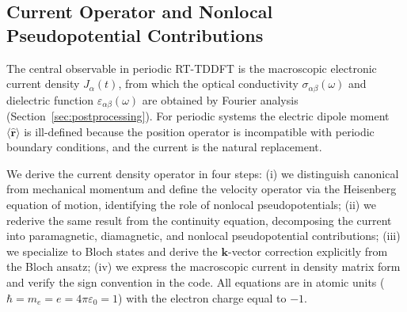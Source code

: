 
\subsection{Current Operator and Nonlocal Pseudopotential Contributions}
\label{sec:current}

The central observable in periodic RT-TDDFT is the macroscopic
electronic current density $J_\alpha(t)$, from which the optical
conductivity $\sigma_{\alpha\beta}(\omega)$ and dielectric function
$\varepsilon_{\alpha\beta}(\omega)$ are obtained by Fourier analysis
(Section~\ref{sec:postprocessing}).
For periodic systems the electric dipole moment
$\langle\hat{\mathbf{r}}\rangle$ is ill-defined because the position
operator is incompatible with periodic boundary
conditions,\cite{resta-1998,king-smith-vanderbilt-1993} and the
current is the natural replacement.

We derive the current density operator in four steps: (i) we
distinguish canonical from mechanical momentum and define the velocity
operator via the Heisenberg equation of motion, identifying the role
of nonlocal pseudopotentials; (ii) we rederive the same result from
the continuity equation, decomposing the current into paramagnetic,
diamagnetic, and nonlocal pseudopotential contributions; (iii) we
specialize to Bloch states and derive the $\mathbf{k}$-vector
correction explicitly from the Bloch ansatz; (iv) we express the
macroscopic current in density matrix form and verify the sign
convention in the code.
All equations are in atomic units ($\hbar = m_e = e = 4\pi\varepsilon_0
= 1$) with the electron charge equal to $-1$.

